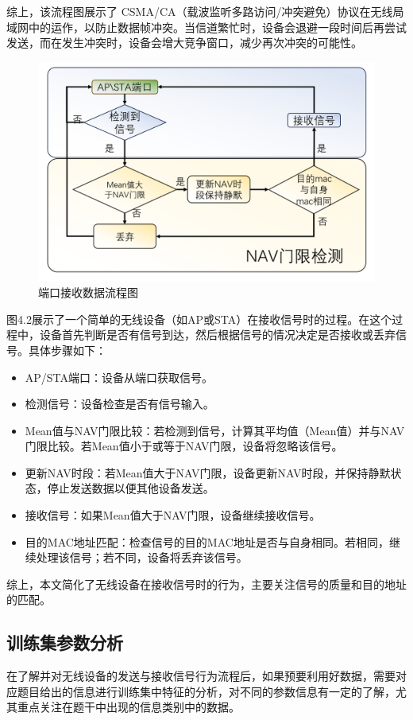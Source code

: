 \documentclass[bwprint]{gmcmthesis}
\begin{document}
综上，该流程图展示了 CSMA/CA（载波监听多路访问/冲突避免）协议在无线局域网中的运作，以防止数据帧冲突。当信道繁忙时，设备会退避一段时间后再尝试发送，而在发生冲突时，设备会增大竞争窗口，减少再次冲突的可能性。

\begin{figure}[H]
	\centering
	\includegraphics[width=0.7\linewidth]{figures/4.2}
	\caption{端口接收数据流程图}
	\label{fig:端口接收数据流程图}
\end{figure}

图4.2展示了一个简单的无线设备（如AP或STA）在接收信号时的过程。在这个过程中，设备首先判断是否有信号到达，然后根据信号的情况决定是否接收或丢弃信号。具体步骤如下：

\begin{itemize}
	\item AP/STA端口：设备从端口获取信号。
	\item 检测信号：设备检查是否有信号输入。
	\item Mean值与NAV门限比较：若检测到信号，计算其平均值（Mean值）并与NAV门限比较。若Mean值小于或等于NAV门限，设备将忽略该信号。
	\item 更新NAV时段：若Mean值大于NAV门限，设备更新NAV时段，并保持静默状态，停止发送数据以便其他设备发送。
	\item 接收信号：如果Mean值大于NAV门限，设备继续接收信号。
	\item 目的MAC地址匹配：检查信号的目的MAC地址是否与自身相同。若相同，继续处理该信号；若不同，设备将丢弃该信号。
\end{itemize}

综上，本文简化了无线设备在接收信号时的行为，主要关注信号的质量和目的地址的匹配。


\subsection{训练集参数分析}

在了解并对无线设备的发送与接收信号行为流程后，如果预要利用好数据，需要对应题目给出的信息进行训练集中特征的分析，对不同的参数信息有一定的了解，尤其重点关注在题干中出现的信息类别中的数据。
\end{document}
